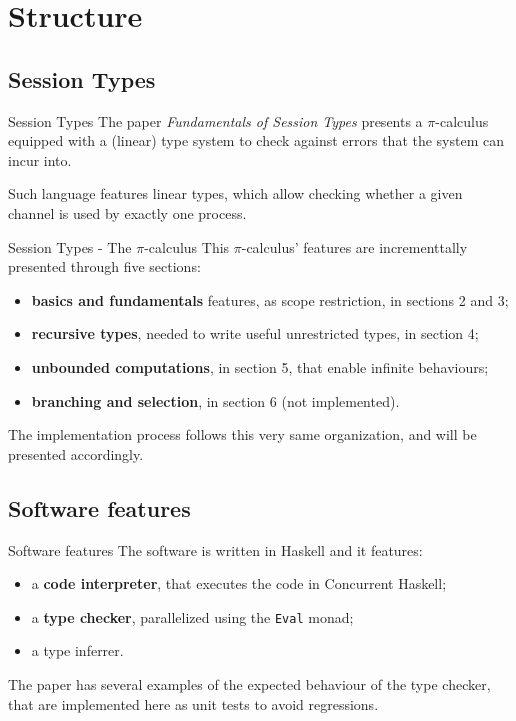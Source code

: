 \section{Structure}

\subsection{Session Types}

\begin{frame}{Session Types}
    The paper \emph{Fundamentals of Session Types} %
    presents a $\pi$-calculus equipped with a (linear) type system to check against errors that the system can incur into.

    Such language features linear types, which allow checking whether a given channel is used by exactly one process.
\end{frame}

\begin{frame}{Session Types - The $\pi$-calculus}
    This $\pi$-calculus' features are incrementtally presented through five sections:
    \begin{itemize}
        \item \textbf{basics and fundamentals} features, as scope restriction, in sections 2 and 3;
        \item \textbf{recursive types}, needed to write useful unrestricted types, in section 4;
        \item \textbf{unbounded computations}, in section 5, that enable infinite behaviours;
        \item \textbf{branching and selection}, in section 6 (not implemented).
    \end{itemize}

    The implementation process follows this very same organization, and will be presented accordingly.
\end{frame}

\subsection{Software features}

\begin{frame}{Software features}
    The software is written in Haskell and it features:
    \begin{itemize}
        \item a \textbf{code interpreter}, that executes the code in Concurrent Haskell;
        \item a \textbf{type checker}, parallelized using the \texttt{Eval} monad;
        \item a type inferrer.
    \end{itemize}

    The paper has several examples of the expected behaviour of the type checker, that are implemented here as unit tests to avoid regressions.
\end{frame}



